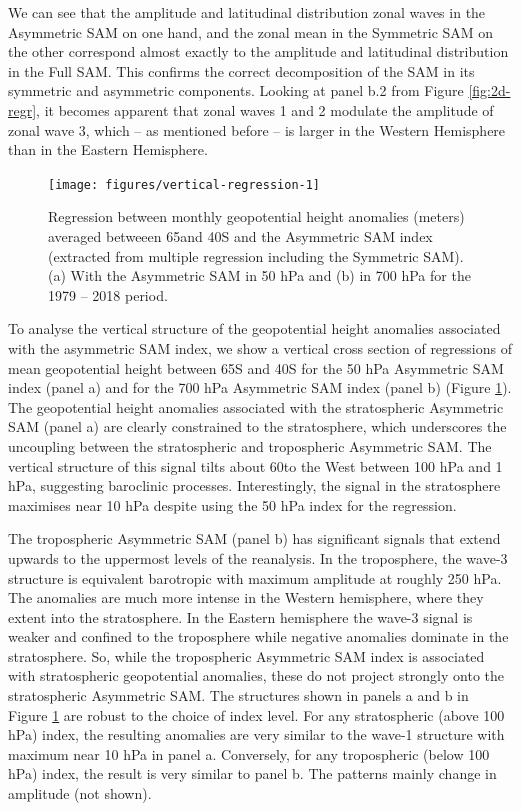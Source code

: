 \documentclass[smallextended]{svjour3}       %
\begin{document}
We can see that the amplitude and latitudinal distribution zonal waves in the Asymmetric SAM on one hand, and the zonal mean in the Symmetric SAM on the other correspond almost exactly to the amplitude and latitudinal distribution in the Full SAM. This confirms the correct decomposition of the SAM in its symmetric and asymmetric components. Looking at panel b.2 from Figure \ref{fig:2d-regr}, it becomes apparent that zonal waves 1 and 2 modulate the amplitude of zonal wave 3, which -- as mentioned before -- is larger in the Western Hemisphere than in the Eastern Hemisphere.

\begin{figure}
\texttt{[image: figures/vertical-regression-1]} \caption{Regression between monthly geopotential height anomalies (meters) averaged betweeen 65\degree and 40\degree S and the Asymmetric SAM index (extracted from multiple regression including the Symmetric SAM). (a) With the Asymmetric SAM in 50 hPa and (b) in 700 hPa for the 1979 -- 2018 period.}\label{fig:vertical-regression}
\end{figure}

To analyse the vertical structure of the geopotential height anomalies associated with the asymmetric SAM index, we show a vertical cross section of regressions of mean geopotential height between 65\degree S and 40\degree S for the 50 hPa Asymmetric SAM index (panel a) and for the 700 hPa Asymmetric SAM index (panel b) (Figure \ref{fig:vertical-regression}). The geopotential height anomalies associated with the stratospheric Asymmetric SAM (panel a) are clearly constrained to the stratosphere, which underscores the uncoupling between the stratospheric and tropospheric Asymmetric SAM. The vertical structure of this signal tilts about 60\degree to the West between 100 hPa and 1 hPa, suggesting baroclinic processes. Interestingly, the signal in the stratosphere maximises near 10 hPa despite using the 50 hPa index for the regression.

The tropospheric Asymmetric SAM (panel b) has significant signals that extend upwards to the uppermost levels of the reanalysis. In the troposphere, the wave-3 structure is equivalent barotropic with maximum amplitude at roughly 250 hPa. The anomalies are much more intense in the Western hemisphere, where they extent into the stratosphere. In the Eastern hemisphere the wave-3 signal is weaker and confined to the troposphere while negative anomalies dominate in the stratosphere. So, while the tropospheric Asymmetric SAM index is associated with stratospheric geopotential anomalies, these do not project strongly onto the stratospheric Asymmetric SAM. The structures shown in panels a and b in Figure \ref{fig:vertical-regression} are robust to the choice of index level. For any stratospheric (above 100 hPa) index, the resulting anomalies are very similar to the wave-1 structure with maximum near 10 hPa in panel a. Conversely, for any tropospheric (below 100 hPa) index, the result is very similar to panel b. The patterns mainly change in amplitude (not shown).
\end{document}
